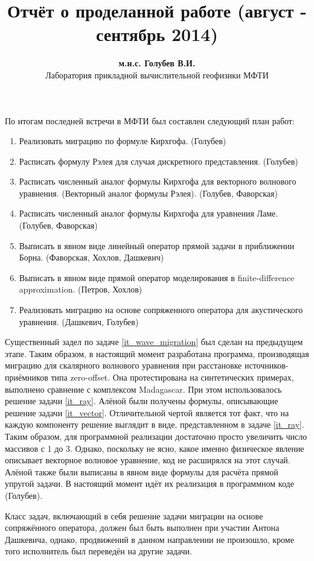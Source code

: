 \documentclass{article}
\begin{document}
\title{Отчёт о проделанной работе (август - сентябрь 2014)}
\author{\textbf{м.н.с. Голубев В.И.} \\ Лаборатория прикладной вычислительной геофизики МФТИ}
\maketitle

По итогам последней встречи в МФТИ был составлен следующий план работ:
\begin{enumerate}
\item \label{it_wave_migration} Реализовать миграцию по формуле Кирхгофа. (Голубев)
\item \label{it_ray} Расписать формулу Рэлея для случая дискретного представления. (Голубев)
\item \label{it_vector} Расписать численный аналог формулы Кирхгофа для векторного волнового уравнения. (Векторный аналог формулы Рэлея). (Голубев, Фаворская)
\item Расписать численный аналог формулы Кирхгофа для уравнения Ламе. (Голубев, Фаворская)
\item Выписать в явном виде линейный оператор прямой задачи в приближении Борна. (Фаворская, Хохлов, Дашкевич)
\item Выписать в явном виде прямой оператор моделирования в finite-difference approximation. (Петров, Хохлов)
\item Реализовать миграцию на основе сопряженного оператора для акустического уравнения. (Дашкевич, Голубев) 
\end{enumerate}

Существенный задел по задаче \ref{it_wave_migration} был сделан на предыдущем этапе.
Таким образом, в настоящий момент разработана программа, производящая миграцию для скалярного волнового уравнения
при расстановке источников-приёмников типа zero-offset.
Она протестирована на синтетических примерах, выполнено сравнение с комплексом Madagascar.
При этом использовалось решение задачи \ref{it_ray}.
Алёной были получены формулы, описывающие решение задачи \ref{it_vector}.
Отличительной чертой является тот факт, что на каждую компоненту решение выглядит в виде, представленном
в задаче \ref{it_ray}.
Таким образом, для программной реализации достаточно просто увеличить число массивов с 1 до 3.
Однако, поскольку не ясно, какое именно физическое явление описывает векторное волновое уравнение, код не расширялся
на этот случай.
Алёной также были выписаны в явном виде формулы для расчёта прямой упругой задачи.
В настоящий момент идёт их реализация в программном коде (Голубев).

Класс задач, включающий в себя решение задачи миграции на основе сопряжённого оператора, должен был быть выполнен
при участии Антона Дашкевича, однако, продвижений в данном направлении не произошло, кроме того исполнитель был
переведён на другие задачи.
\end{document}
